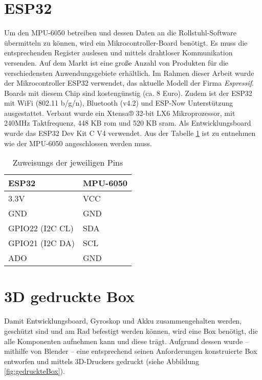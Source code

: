 \section{ESP32}
Um den MPU-6050 betreiben und dessen Daten an die Rollstuhl-Software übermitteln zu können, wird ein Mikrocontroller-Board benötigt.
Es muss die entsprechenden Register auslesen und mittels drahtloser Kommunikation versenden.
Auf dem Markt ist eine große Anzahl von Produkten für die verschiedensten Anwendungsgebiete erhältlich.
Im Rahmen dieser Arbeit wurde der Mikrocontroller ESP32 verwendet, das aktuelle Modell der Firma \textit{Espressif}.
Boards mit diesem Chip sind kostengünstig (ca. 8 Euro).
Zudem ist der ESP32 mit WiFi (802.11 b/g/n), Bluetooth (v4.2) und ESP-Now Unterstützung ausgestattet\cite{ESP32Datasheet2022}.
Verbaut wurde ein Xtensa® 32-bit LX6 Mikroprozessor, mit 240MHz Taktfrequenz, 448 KB \ac{rom} und 520 KB \ac{sram}\cite{ESP32Datasheet2022}.
Als Entwicklungsboard wurde das ESP32 Dev Kit C V4 verwendet.
Aus der Tabelle \ref{tab:pinZuweisung} ist zu entnehmen wie der MPU-6050 angeschlossen werden muss.
\begin{table}[h]
    \centering
    \begin{threeparttable}
        \caption{Zuweisungs der jeweiligen Pins}
        \begin{tabular}{|l|l|}
            \hline
            \textbf{ESP32}                          & \textbf{MPU-6050}           \\ \hline
            \parbox[c][0.5cm]{3cm}{3.3V}            & \parbox[c][0.5cm]{3cm}{VCC} \\ \hline
            \parbox[c][0.5cm]{3cm}{GND}             & \parbox[c][0.5cm]{3cm}{GND} \\ \hline
            \parbox[c][0.5cm]{3cm}{GPIO22 (I2C CL)} & \parbox[c][0.5cm]{3cm}{SDA} \\ \hline
            \parbox[c][0.5cm]{3cm}{GPIO21 (I2C DA)} & \parbox[c][0.5cm]{3cm}{SCL} \\ \hline
            \parbox[c][0.5cm]{3cm}{ADO}             & \parbox[c][0.5cm]{3cm}{GND} \\ \hline
        \end{tabular}
        \label{tab:pinZuweisung}
    \end{threeparttable}
\end{table}

\section{3D gedruckte Box}
Damit Entwicklungsboard, Gyroskop und Akku zusammengehalten werden, geschützt sind und am Rad befestigt werden können, wird eine Box benötigt, die alle Komponenten aufnehmen kann und diese trägt.
Aufgrund dessen wurde – mithilfe von Blender – eine entsprechend seinen Anforderungen konstruierte Box entworfen und mittels 3D-Druckers gedruckt (siehe Abbildung \ref{fig:gedruckteBox}).

